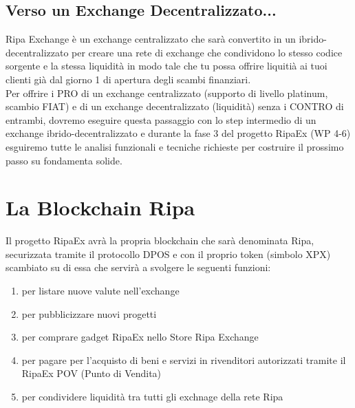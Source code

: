 \documentclass[11pt,fleqn,oneside]{book} %
\begin{document}
\section{Verso un Exchange Decentralizzato...}
Ripa Exchange è un exchange centralizzato che sarà convertito in un ibrido-decentralizzato per creare una rete di exchange
che condividono lo stesso codice sorgente e la stessa liquidità in modo tale che tu possa offrire liquitià ai tuoi clienti 
già dal giorno 1 di apertura degli scambi finanziari.\\

Per offrire i PRO di un exchange centralizzato (supporto di livello platinum, scambio FIAT) e di un exchange decentralizzato
(liquidità) senza i CONTRO di entrambi, dovremo eseguire questa passaggio con lo step intermedio di un exchange 
ibrido-decentralizzato e durante la fase 3 del progetto RipaEx (WP 4-6) esguiremo tutte le analisi funzionali e tecniche 
richieste per costruire il prossimo passo su fondamenta solide. 




\chapter{La Blockchain Ripa}
Il progetto RipaEx avrà la propria blockchain che sarà denominata Ripa, securizzata tramite il protocollo DPOS e
con il proprio token \PHP (simbolo XPX) scambiato su di essa che servirà a svolgere le seguenti funzioni:
	\begin{enumerate}
		\item per listare nuove valute nell'exchange
		\item per pubblicizzare nuovi progetti
		\item per comprare gadget RipaEx nello Store Ripa Exchange
		\item per pagare per l'acquisto di beni e servizi in rivenditori autorizzati tramite il RipaEx POV (Punto di Vendita)
		\item per condividere liquidità tra tutti gli exchnage della rete Ripa
	\end{enumerate}
\end{document}
